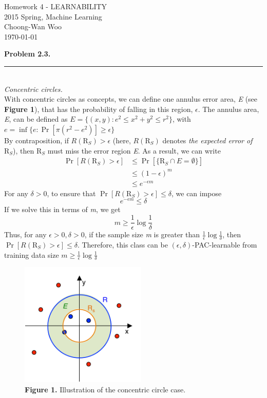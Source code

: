 \documentclass[letterpaper,11pt,notitlepage]{article}
\begin{document}
\begin{center}
	Homework 4 - LEARNABILITY\\
	2015 Spring, Machine Learning\\
	Choong-Wan Woo\\
	\today\\
\end{center}

\hspace*{-1cm}\textbf{Problem 2.3.}  \rule{10.5cm}{0.4pt}\\
\noindent\textit{Concentric circles.}\\

\indent With concentric circles as concepts, we can define one annulus error area, \textit{E} (see \textbf{Figure 1}), that has the probability of falling in this region, $\epsilon$. The annulus area, \textit{E}, can be defined as $E = \{(x,y):e^2\le x^2+y^2 \le r^2\}$, with $e = \inf\{e:\Pr[\pi(r^2-e^2)]\ge \epsilon\}$\\
\indent By contraposition, if $R(\text{R}_S)>\epsilon$ (here, $R(\text{R}_S)$ denotes \textit{the expected error of} $\text{R}_S$), then $\text{R}_S$ must miss the error region \textit{E}. As a result, we can write
\begin{align*}
\Pr [R(\text{R}_S)>\epsilon] &\le \Pr[\{\text{R}_S\cap E =\emptyset\}]\\
&\le(1-\epsilon)^m\\
&\le e^{-\epsilon m}
\end{align*}
\noindent For any $\delta >0$, to ensure that $\Pr[R(\text{R}_S) > \epsilon] \le \delta$, we can impose
\[e^{-\epsilon m} \le \delta\]
If we solve this in terms of \textit{m}, we get
\[m \ge \frac{1}{\epsilon}\log \frac{1}{\delta}\]
\noindent Thus, for any $\epsilon >0, \delta>0$, if the sample size \textit{m} is greater than $\frac{1}{\epsilon}\log \frac{1}{\delta}$, then $\Pr[R(\text{R}_S) > \epsilon] \le \delta$. Therefore, this class can be $(\epsilon,\delta)$-PAC-learnable from training data size $m \ge \frac{1}{\epsilon}\log \frac{1}{\delta}$

\begin{figure}[ht!]
	\centering
	\includegraphics[width=6cm]{Figure1}
	\captionsetup{width=.8\textwidth}
	\caption{\textbf{Figure 1.} Illustration of the concentric circle case.} 
\end{figure}
\end{document}

